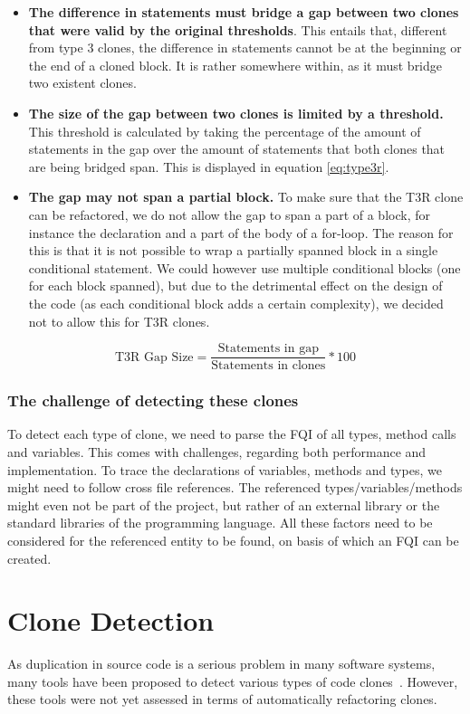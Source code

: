 \documentclass[a4paper]{article}
\begin{document}
\begin{itemize}
  \item \textbf{The difference in statements must bridge a gap between two clones that were valid by the original thresholds}. This entails that, different from type 3 clones, the difference in statements cannot be at the beginning or the end of a cloned block. It is rather somewhere within, as it must bridge two existent clones.
  \item \textbf{The size of the gap between two clones is limited by a threshold.} This threshold is calculated by taking the percentage of the amount of statements in the gap over the amount of statements that both clones that are being bridged span. This is displayed in equation \ref{eq:type3r}.
  \item \textbf{The gap may not span a partial block.} To make sure that the T3R clone can be refactored, we do not allow the gap to span a part of a block, for instance the declaration and a part of the body of a for-loop. The reason for this is that it is not possible to wrap a partially spanned block in a single conditional statement. We could however use multiple conditional blocks (one for each block spanned), but due to the detrimental effect on the design of the code (as each conditional block adds a certain complexity), we decided not to allow this for T3R clones.
\end{itemize}

\begin{equation}\label{eq:type3r}
\text{T3R Gap Size}=\frac{\text{Statements in gap}}{\text{Statements in clones}}*100
\end{equation}

\subsubsection{The challenge of detecting these clones}\label{chap:challenge}
To detect each type of clone, we need to parse the FQI of all types, method calls and variables. This comes with challenges, regarding both performance and implementation. To trace the declarations of variables, methods and types, we might need to follow cross file references. The referenced types/variables/methods might even not be part of the project, but rather of an external library or the standard libraries of the programming language. All these factors need to be considered for the referenced entity to be found, on basis of which an FQI can be created.

\section{Clone Detection}\label{chap:clonedetection}
As duplication in source code is a serious problem in many software systems, many tools have been proposed to detect various types of code clones~\cite{sheneamer2016survey, svajlenko2014evaluating}. However, these tools were not yet assessed in terms of automatically refactoring clones.
\end{document}
